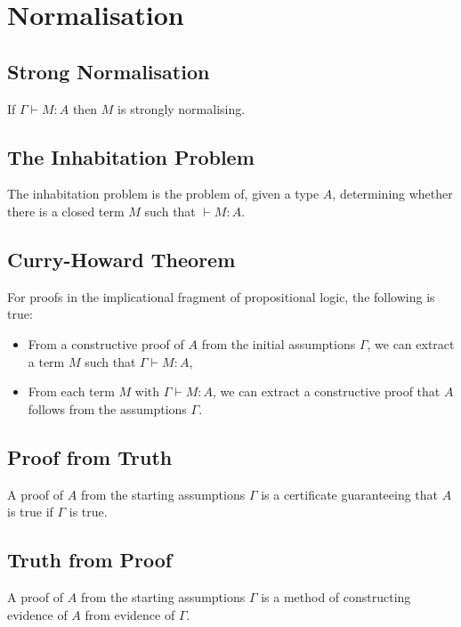 \section{Normalisation}

\subsection{Strong Normalisation}

If $\Gamma \vdash M : A$ then $M$ is strongly normalising.

\subsection{The Inhabitation Problem}

The inhabitation problem is the problem of, given a type $A$, determining
whether there is a closed term $M$ such that $\vdash M : A$.

\subsection{Curry-Howard Theorem}

For proofs in the implicational fragment of propositional
logic, the following is true: \begin{itemize}
    \item From a constructive proof of $A$ from the initial assumptions
        $\Gamma$, we can extract a term $M$ such that $\Gamma \vdash M : A$,
    \item From each term $M$ with $\Gamma \vdash M : A$, we can extract
        a constructive proof that $A$ follows from the assumptions $\Gamma$.
\end{itemize}

\subsection{Proof from Truth}

A proof of $A$ from the starting assumptions $\Gamma$ is a certificate
guaranteeing that $A$ is true if $\Gamma$ is true.

\subsection{Truth from Proof}

A proof of $A$ from the starting assumptions $\Gamma$ is a method
of constructing evidence of $A$ from evidence of $\Gamma$.

